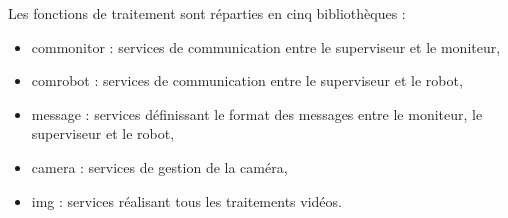 Les fonctions de traitement sont réparties en cinq bibliothèques :
\begin{itemize}
	\item commonitor : services de communication entre le superviseur et le moniteur,
	\item comrobot : services de communication entre le superviseur et le robot,
	\item message : services définissant le format des messages entre le moniteur, le superviseur et le robot,
	\item camera : services de gestion de la caméra,
	\item img : services réalisant tous les traitements vidéos. \\
\end{itemize}


